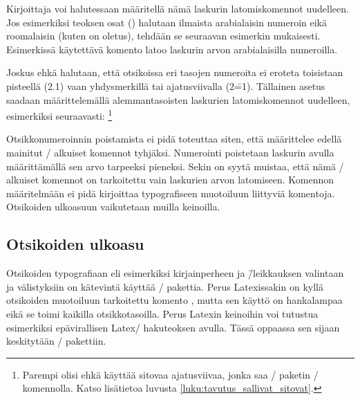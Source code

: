 Kirjoittaja voi halutessaan määritellä nämä laskurin latomiskomennot
uudelleen. Jos esimerkiksi teoksen osat () halutaan
ilmaista arabialaisin numeroin eikä roomalaisin (kuten on oletus),
tehdään se seuraavan esimerkin mukaisesti. Esimerkissä käytettävä
komento  latoo laskurin arvon arabialaisilla numeroilla.

\begin{koodilohkosis}
\renewcommand{\thepart}{\arabic{part}}
\end{koodilohkosis}

Joskus ehkä halutaan, että otsikoissa eri tasojen numeroita ei eroteta
toisistaan pisteellä (2.1) vaan yhdysmerkillä tai ajatusviivalla
(2\==1). Tällainen asetus saadaan määrittelemällä alemmantasoisten
laskurien latomiskomennot uudelleen, esimerkiksi seuraavasti:%
\footnote{Parempi olisi ehkä käyttää sitovaa ajatusviivaa, jonka saa
  \-/ paketin \komento{==}\-/ komennolla. Katso
  lisätietoa luvusta \ref{luku:tavutus_sallivat_sitovat}.}

\begin{koodilohkosis}
\renewcommand{\thesubsection}{\thesection--\arabic{subsection}}
\renewcommand{\thesubsubsection}{%
  \thesubsection--\arabic{subsubsection}}
\end{koodilohkosis}

Otsikkonumeroinnin poistamista ei pidä toteuttaa siten, että määrittelee
edellä mainitut \-/ alkuiset komennot tyhjäksi. Numerointi
poistetaan laskurin  avulla määrittämällä sen arvo
tarpeeksi pieneksi. Sekin on syytä muistaa, että nämä \-/
alkuiset komennot on tarkoitettu vain laskurien arvon latomiseen.
Komennon määritelmään ei pidä kirjoittaa typografiseen muotoiluun
liittyviä komentoja. Otsikoiden ulkoasuun vaikutetaan muilla keinoilla.

\subsection{Otsikoiden ulkoasu}
\label{luku:otsikot_ulkoasu}

Otsikoiden typografiaan eli esimerkiksi kirjainperheen ja \=/leikkauksen
valintaan ja välistyksiin on kätevintä käyttää \-/
pakettia. Perus Latexissakin on kyllä otsikoiden
muotoiluun tarkoitettu komento , mutta sen
käyttö on hankalampaa eikä se toimi kaikilla otsikkotasoilla. Perus
Latexin keinoihin voi tutustua esimerkiksi epävirallisen Latex\-/
hakuteoksen \textcite{unoffref} avulla. Tässä oppaassa sen sijaan
keskitytään \-/ pakettiin.

